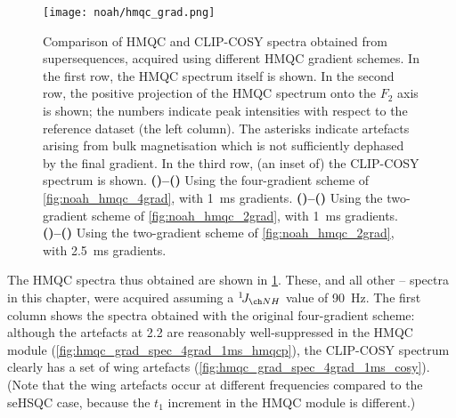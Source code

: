 \begin{figure}[!htbp]
    \centering
    \texttt{[image: noah/hmqc\_grad.png]}%
    {\label{fig:hmqc_grad_spec_4grad_1ms_hmqc}}%
    {\label{fig:hmqc_grad_spec_4grad_1ms_hmqcp}}%
    {\label{fig:hmqc_grad_spec_4grad_1ms_cosy}}%
    {\label{fig:hmqc_grad_spec_2grad_1ms_hmqc}}%
    {\label{fig:hmqc_grad_spec_2grad_1ms_hmqcp}}%
    {\label{fig:hmqc_grad_spec_2grad_1ms_cosy}}%
    {\label{fig:hmqc_grad_spec_2grad_2p5ms_hmqc}}%
    {\label{fig:hmqc_grad_spec_2grad_2p5ms_hmqcp}}%
    {\label{fig:hmqc_grad_spec_2grad_2p5ms_cosy}}%
    \caption[Comparison of  modules with different HMQC gradient schemes]{
        Comparison of HMQC and CLIP-COSY spectra obtained from  supersequences, acquired using different HMQC gradient schemes.
        In the first row, the HMQC spectrum itself is shown.
        In the second row, the positive projection of the HMQC spectrum onto the $F_2$ axis is shown; the numbers indicate peak intensities with respect to the reference dataset (the left column).
        The asterisks indicate artefacts arising from bulk magnetisation which is not sufficiently dephased by the final gradient.
        In the third row, (an inset of) the CLIP-COSY spectrum is shown.
        \textbf{()--()} Using the four-gradient scheme of \cref{fig:noah_hmqc_4grad}, with \qty{1}{ms} gradients.
        \textbf{()--()} Using the two-gradient scheme of \cref{fig:noah_hmqc_2grad}, with \qty{1}{ms} gradients.
        \textbf{()--()} Using the two-gradient scheme of \cref{fig:noah_hmqc_2grad}, with \qty{2.5}{ms} gradients.
    }
    \label{fig:hmqc_grad_spec}
\end{figure}

The HMQC spectra thus obtained are shown in \cref{fig:hmqc_grad_spec}.
These, and all other \proton{}--\nitrogen{} spectra in this chapter, were acquired assuming a $\oneJ{NH}$ value of \qty{90}{\Hz}.
The first column shows the spectra obtained with the original four-gradient scheme: although the artefacts at \qty{2.2}{\ppm} are reasonably well-suppressed in the HMQC module (\cref{fig:hmqc_grad_spec_4grad_1ms_hmqcp}), the CLIP-COSY spectrum clearly has a set of wing artefacts (\cref{fig:hmqc_grad_spec_4grad_1ms_cosy}).
(Note that the wing artefacts occur at different frequencies compared to the \carbon{} seHSQC case, because the $t_1$ increment in the \nitrogen{} HMQC module is different.)


